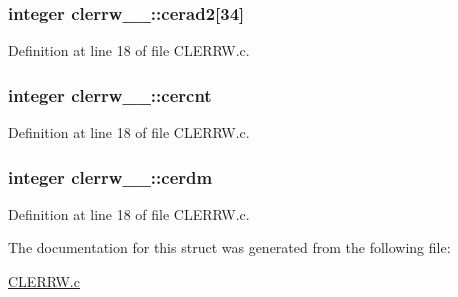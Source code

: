\subsubsection[{\texorpdfstring{cerad2}{cerad2}}]{\setlength{\rightskip}{0pt plus 5cm}integer clerrw\+\_\+\_\+\+::cerad2\mbox{[}34\mbox{]}}\hypertarget{structclerrw__1___a9742bc326ea0ac30259718a2f0114a02}{}\label{structclerrw__1___a9742bc326ea0ac30259718a2f0114a02}


Definition at line 18 of file C\+L\+E\+R\+R\+W.\+c.

\subsubsection[{\texorpdfstring{cercnt}{cercnt}}]{\setlength{\rightskip}{0pt plus 5cm}integer clerrw\+\_\+\_\+\+::cercnt}\hypertarget{structclerrw__1___a5d701f6074bf0778740e0916532321c1}{}\label{structclerrw__1___a5d701f6074bf0778740e0916532321c1}


Definition at line 18 of file C\+L\+E\+R\+R\+W.\+c.

\subsubsection[{\texorpdfstring{cerdm}{cerdm}}]{\setlength{\rightskip}{0pt plus 5cm}integer clerrw\+\_\+\_\+\+::cerdm}\hypertarget{structclerrw__1___ab9df427398c30754c709a46c69cdbe30}{}\label{structclerrw__1___ab9df427398c30754c709a46c69cdbe30}


Definition at line 18 of file C\+L\+E\+R\+R\+W.\+c.



The documentation for this struct was generated from the following file\+:\begin{DoxyCompactItemize}
\item 
\hyperlink{CLERRW_8c}{C\+L\+E\+R\+R\+W.\+c}\end{DoxyCompactItemize}
